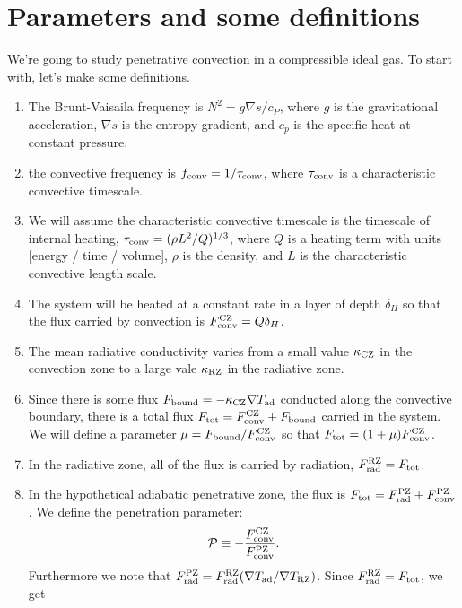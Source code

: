 \documentclass[onecolumn, amsmath, amsfonts, amssymb]{aastex62}
\newcommand{\grad}{\ensuremath{\nabla}}
\newcommand{\FconvCZ}{\ensuremath{F_{\rm{conv}}^{\rm{CZ}}}}
\newcommand{\FconvPZ}{\ensuremath{F_{\rm{conv}}^{\rm{PZ}}}}
\begin{document}
\section{Parameters and some definitions}
We're going to study penetrative convection in a compressible ideal gas.
To start with, let's make some definitions.
\begin{enumerate}
    \item The Brunt-Vaisaila frequency is $N^2 = g \grad s / c_P$, where $g$ is the gravitational acceleration, $\grad s$ is the entropy gradient, and $c_p$ is the specific heat at constant pressure.
    \item the convective frequency is $f_{\rm{conv}} = 1/\tau_{\rm{conv}}$, where $\tau_{\rm{conv}}$ is a characteristic convective timescale.
    \item We will assume the characteristic convective timescale is the timescale of internal heating, $\tau_{\rm{conv}} = (\rho L^2 / Q)^{1/3}$, where $Q$ is a heating term with units [energy / time / volume], $\rho$ is the density, and $L$ is the characteristic convective length scale.
    \item The system will be heated at a constant rate in a layer of depth $\delta_H$ so that the flux carried by convection is $\FconvCZ = Q \delta_H$.
    \item The mean radiative conductivity varies from a small value $\kappa_{\rm{CZ}}$ in the convection zone to a large vale $\kappa_{\rm{RZ}}$ in the radiative zone.
    \item Since there is some flux $F_{\rm{bound}} = - \kappa_{\rm{CZ}}\grad T_{\rm{ad}}$ conducted along the convective boundary, there is a total flux $F_{\rm{tot}} = \FconvCZ + F_{\rm{bound}}$ carried in the system.
        We will define a parameter $\mu = F_{\rm{bound}}/\FconvCZ$ so that $F_{\rm{tot}} = (1 + \mu) \FconvCZ$.
    \item In the radiative zone, all of the flux is carried by radiation, $F_{\rm{rad}}^{\rm{RZ}} = F_{\rm{tot}}$.
    \item In the hypothetical adiabatic penetrative zone, the flux is $F_{\rm{tot}} = F_{\rm{rad}}^{\rm{PZ}} + F_{\rm{conv}}^{\rm{PZ}}$.
        We define the penetration parameter:
        \begin{equation}
            \mathcal{P} \equiv -\frac{\FconvCZ}{\FconvPZ}.
        \end{equation}
        Furthermore we note that $F_{\rm{rad}}^{\rm{PZ}} = F_{\rm{rad}}^{\rm{RZ}}(\grad T_{\rm{ad}} / \grad T_{\rm{RZ}})$.
        Since $F_{\rm{rad}}^{\rm{RZ}} = F_{\rm{tot}}$, we get

\end{enumerate}
\end{document}
